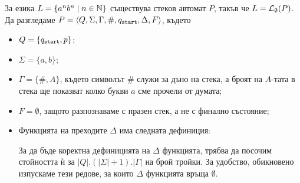 \begin{example}
  \label{ex:anbn}
  За езика $L = \{a^nb^n\mid n\in\mathbb{N}\}$ съществува стеков автомат $P$, такъв че
  $L = \mathcal{L}_\emptyset(P)$.
  Да разгледаме $P = \langle{Q,\Sigma,\Gamma,\#,q_{\texttt{start}},\Delta,F}\rangle$, където
  \begin{itemize}
  \item
    $Q = \{q_{\texttt{start}},p\}$;
  \item
    $\Sigma = \{a,b\}$;
  \item
    $\Gamma = \{\#,A\}$, където символът $\#$ служи за дъно на стека, а броят на $A$-тата в стека ще показват колко букви $a$ сме прочели от думата;
  \item
    $F = \emptyset$, защото разпознаваме с празен стек, а не с финално състояние;
  \item
    Функцията на преходите $\Delta$ има следната дефиниция:


    За да бъде коректна дефиницията на $\Delta$ функцията, трябва да посочим стойността ѝ за $|Q| . (|\Sigma| + 1) . |\Gamma|$ на брой тройки.
    За удобство, обикновено изпускаме тези редове, за които $\Delta$ функцията връща $\emptyset$.
   

\end{itemize}
\end{example}

